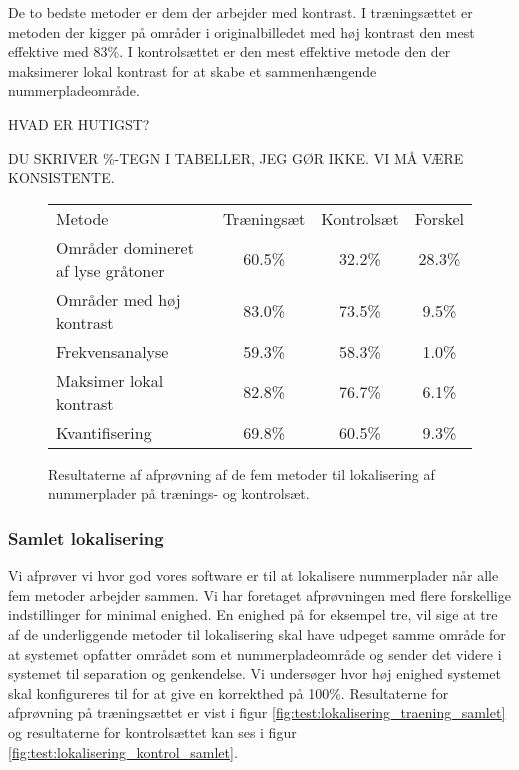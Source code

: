 De to bedste metoder er dem der arbejder med kontrast. I træningsættet er metoden der kigger på områder i originalbilledet med høj kontrast den mest effektive med 83\%. I kontrolsættet er den mest effektive metode den der maksimerer lokal kontrast for at skabe et sammenhængende nummerpladeområde. 

HVAD ER HUTIGST?

DU SKRIVER \%-TEGN I TABELLER, JEG GØR IKKE. VI MÅ VÆRE KONSISTENTE.

\begin{figure}[htp]
\centering
\begin{tabular}{|l|c|c|c|}
\hline
\rowcolor[gray]{0.9} \multicolumn{4}{|>{\columncolor[gray]{0.9}}c|}{\textbf{Individuelle metoder til lokalisering}} \\ \hline
Metode & Træningsæt & Kontrolsæt & Forskel \\ \hline
Områder domineret af lyse gråtoner & 60.5\% & 32.2\% & 28.3\% \\ \hline
Områder med høj kontrast           & 83.0\% & 73.5\% &  9.5\% \\ \hline
Frekvensanalyse                    & 59.3\% & 58.3\% &  1.0\% \\ \hline
Maksimer lokal kontrast            & 82.8\% & 76.7\% &  6.1\% \\ \hline
Kvantifisering                     & 69.8\% & 60.5\% &  9.3\% \\ \hline
\end{tabular}
\caption{Resultaterne af afprøvning af de fem metoder til lokalisering af nummerplader på trænings- og kontrolsæt.}
\label{fig:test:lokalisering_traening_kontrol}
\end{figure}


\subsubsection{Samlet lokalisering}
Vi afprøver vi hvor god vores software er til at lokalisere nummerplader når alle fem metoder arbejder sammen. Vi har foretaget afprøvningen med flere forskellige indstillinger for minimal enighed. En enighed på for eksempel tre, vil sige at tre af de underliggende metoder til lokalisering skal have udpeget samme område for at systemet opfatter området som et nummerpladeområde og sender det videre i systemet til separation og genkendelse. Vi undersøger hvor høj enighed systemet skal konfigureres til for at give en korrekthed på 100\%. Resultaterne for afprøvning på træningsættet er vist i figur \vref{fig:test:lokalisering_traening_samlet} og resultaterne for kontrolsættet kan ses i figur \ref{fig:test:lokalisering_kontrol_samlet}.

